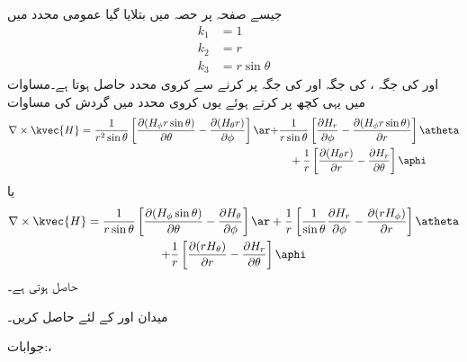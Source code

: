 جیسے صفحہ  پر حصہ  میں بتلایا گیا عمومی محدد میں
\begin{align*}
k_1&=1\\
k_2&=r\\
k_3&= r \sin \theta
\end{align*}
اور  کی جگہ ،  کی جگہ  اور  کی جگہ  پر کرنے سے کروی محدد حاصل ہوتا ہے۔مساوات  میں یہی کچھ پر کرتے ہوئے یوں کروی محدد میں گردش کی مساوات
\begin{align*}
\nabla \times \kvec{H}=\frac{1}{r^2 \sin \theta}\left[\frac{\partial (H_\phi r \sin \theta)}{\partial \theta}-\frac{\partial (H_{\theta} r)}{\partial \phi} \right]\ar+&\frac{1}{r \sin \theta}\left[\frac{\partial H_r }{\partial \phi}-\frac{\partial (H_\phi  r \sin \theta)}{\partial r} \right]\atheta\\
&\quad +\frac{1}{r}\left[\frac{\partial (H_\theta r)}{\partial r}-\frac{\partial H_r }{\partial \theta} \right]\aphi
\end{align*}
یا
\begin{multline}\label{مساوات_مقناطیسی_کروی_گردش}
\nabla \times \kvec{H}=\frac{1}{r \sin \theta}\left[\frac{\partial (H_{\phi}  \sin \theta)}{\partial \theta}-\frac{\partial H_{\theta} }{\partial \phi} \right]\ar+\frac{1}{r }\left[\frac{1}{\sin \theta}\frac{\partial H_r }{\partial \phi}-\frac{\partial (r H_{\phi} )}{\partial r} \right]\atheta
\\
 +\frac{1}{r}\left[\frac{\partial (r H_\theta )}{\partial r}-\frac{\partial H_r }{\partial \theta} \right]\aphi
\end{multline}
حاصل ہوتی ہے۔

میدان   اور   کے لئے   حاصل کریں۔

جوابات:، 

